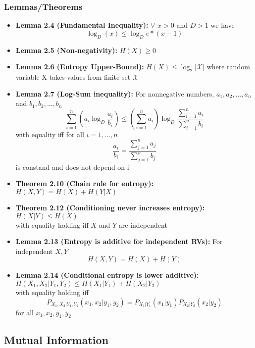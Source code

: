\documentclass{article}
\begin{document}
\subsubsection{Lemmas/Theorems}
\begin{flushleft}
    \begin{itemize}
        \item \textbf{Lemma 2.4 (Fundamental Inequality):} \(\forall\) \(x>0\) and \(D > 1\) we have \[\log_{D}{(x)} \leq \log_{D}{e}*(x-1) \]

        \item \textbf{Lemma 2.5 (Non-negativity):} \(H(X) \geq 0\)
    
        \item \textbf{Lemma 2.6 (Entropy Upper-Bound):} \(H(X) \leq \log_{2}{|\mathcal{X}|} \) where random variable X takes values from finite set \(\mathcal{X}\)
    
        \item \textbf{Lemma 2.7 (Log-Sum inequality):} For nonnegative numbers, \(a_1, a_2, \ldots, a_n\) and \(b_1, b_2, \ldots, b_n\)
        \[\sum_{i=1}^{n}(a_i \log_D \frac{a_i}{b_i}) \leq (\sum_{i=1}^n a_i) \log_D \frac{\sum_{i=1}^n a_i}{\sum_{i=1}^n b_i}\]  
        with equality iff for all \(i=1, \ldots, n\)
        \[\frac{a_i}{b_i} = \frac{\sum_{j=1}^n a_j}{\sum_{j=1}^n b_j}\]
        is constand and does not depend on i
        \item \textbf{Theorem 2.10 (Chain rule for entropy): } \( H(X,Y) = H(X) + H(Y|X)\)
        \item \textbf{Theorem 2.12 (Conditioning never increases entropy):} \(H(X|Y) \leq H(X)\) \\
        with equality holding iff \(X\) and \(Y\) are independent
        \item \textbf{Lemma 2.13 (Entropy is additive for independent RVs): } For independent \(X, Y\)
        \[H(X,Y) = H(X) + H(Y)\]
        \item \textbf{Lemma 2.14 (Conditional entropy is lower additive): } \(H(X_1, X_2|Y_1, Y_2) \leq H(X_1|Y_1) + H(X_2|Y_2)\)
        \\ with equality holding iff 
        \[P_{X_1, X_2|Y_1, Y_2} (x_1, x_2|y_1, y_2) = P_{X_1|Y_1}(x_1|y_1)P_{X_2|Y_2}(x_2|y_2)\]
        for all \(x_1, x_2, y_1, y_2\)

    \end{itemize}
\end{flushleft}

\subsection{Mutual Information}
\end{document}

